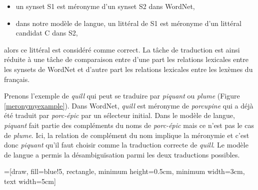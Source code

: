 \begin{itemize}

    \item un synset S1 est méronyme d'un synset S2 dans WordNet,

    \item dans notre modèle de langue, un littéral de S1 est méronyme d'un
        littéral candidat C dans S2,

\end{itemize}

alors ce littéral est considéré comme correct. La tâche de traduction est ainsi
réduite à une tâche de comparaison entre d'une part les relations lexicales
entre les synsets de WordNet et d'autre part les relations lexicales entre les
lexèmes du français.

Prenons l'exemple de \textit{quill} qui peut se traduire par \textit{piquant}
ou \textit{plume} (Figure \ref{meronymyexample}). Dans WordNet, \textit{quill}
est méronyme de \textit{porcupine} qui a déjà été traduit par
\textit{porc-épic} par un sélecteur initial. Dans le modèle de langue,
\textit{piquant} fait partie des compléments du noms de \textit{porc-épic} mais
ce n'est pas le cas de \textit{plume}. Ici, la relation de complément du nom
implique la méronymie et c'est donc \textit{piquant} qu'il faut choisir comme
la traduction correcte de \textit{quill}. Le modèle de langue a permis la
désambiguïsation parmi les deux traductions possibles.

=[draw, fill=blue!5, rectangle, minimum height=0.5cm, minimum width=3cm, text width=5cm]

